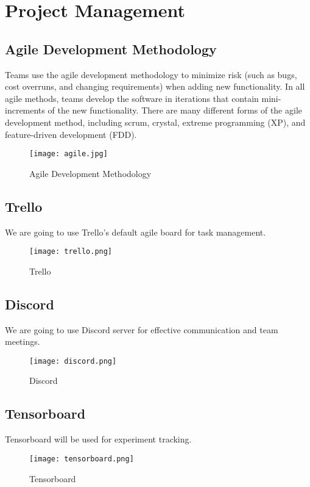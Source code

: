 \chapter{Project Management}
\section{Agile Development Methodology}
Teams use the agile development methodology to minimize risk (such as bugs, cost overruns, and changing requirements) when adding new functionality. In all agile methods, teams develop the software in iterations that contain mini-increments of the new functionality. There are many different forms of the agile development method, including scrum, crystal, extreme programming (XP), and feature-driven development (FDD).

\begin{figure}[H]
    \centering
    \texttt{[image: agile.jpg]}
    \caption{Agile Development Methodology}
    \label{fig:Agile Development Methodology}
\end{figure}

\section{Trello}
We are going to use Trello's default agile board for task management. 
\begin{figure}[H]
    \centering
    \texttt{[image: trello.png]}
    \caption{Trello}
    \label{fig:Trello}
\end{figure}

\section{Discord}
We are going to use Discord server for effective communication and team meetings.

\begin{figure}[H]
    \centering
    \texttt{[image: discord.png]}
    \caption{Discord}
    \label{fig:Discord}
\end{figure}

\section{Tensorboard}
Tensorboard will be used for experiment tracking.
\begin{figure}[H]
    \centering
    \texttt{[image: tensorboard.png]}
    \caption{Tensorboard}
    \label{fig:Tensorboard}
\end{figure}

